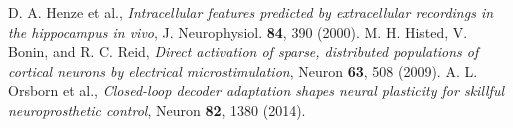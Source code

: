  D. A. Henze et al., \emph{Intracellular features predicted by extracellular recordings in the hippocampus in vivo}, J. Neurophysiol. \textbf{84}, 390 (2000).
 M. H. Histed, V. Bonin, and R. C. Reid, \emph{Direct activation of sparse, distributed populations of cortical neurons by electrical microstimulation}, Neuron \textbf{63}, 508 (2009).
 A. L. Orsborn et al., \emph{Closed-loop decoder adaptation shapes neural plasticity for skillful neuroprosthetic control}, Neuron \textbf{82}, 1380 (2014).
